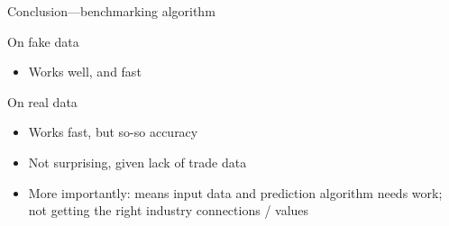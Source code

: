 \documentclass[12pt]{beamer}
\begin{document}
\begin{frame}{Conclusion---benchmarking algorithm}

\begin{block}{On fake data}
\begin{itemize}
\item Works well, and fast
\end{itemize}
\end{block}


\begin{block}{On real data}
\begin{itemize}
\item Works fast, but so-so accuracy
\item Not surprising, given lack of trade data
\item More importantly: means input data and prediction algorithm needs work; not getting the right industry connections / values
\end{itemize}
\end{block}



\end{frame}


%
%
%

%
%
\end{document}
